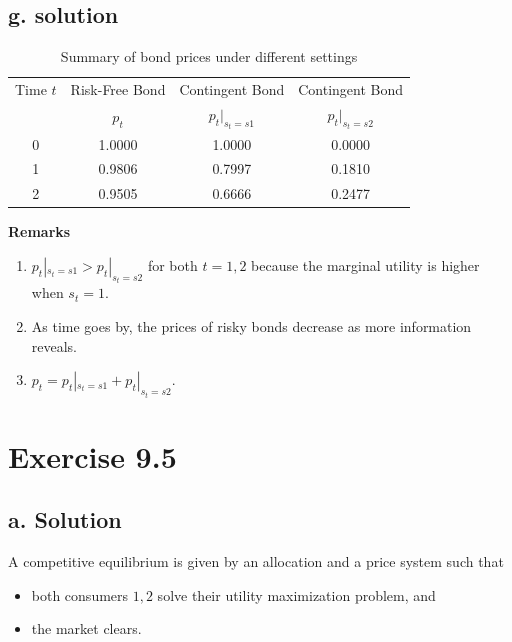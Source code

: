 \documentclass[11pt]{article}
\theoremstyle{definition}
\theoremstyle{boldtitle} %
\numberwithin{equation}{section}
\numberwithin{figure}{section}
\numberwithin{table}{section}
\begin{document}
\subsection{g. solution}
\begin{table}[h!]
\centering
\caption{Summary of bond prices under different settings}
\begin{tabular}{cccc}
\hline
Time $t$ & Risk-Free Bond & Contingent Bond & Contingent Bond \\ 
         &  $p_t$         &  $p_t|_{s_t = s1}$ & $p_t|_{s_t = s2}$ \\ \hline
0        & 1.0000               & 1.0000                           & 0.0000                           \\ 
1        & 0.9806               & 0.7997                           & 0.1810                           \\ 
2        & 0.9505               & 0.6666                           & 0.2477                           \\ \hline
\end{tabular}
\end{table}
\noindent \textbf{Remarks}
\begin{enumerate}
  \item $p_t|_{s_t = s1} > p_t|_{s_t = s2}$ for both $t = 1, 2$ because the marginal utility is higher when $s_t = 1$.
  \item As time goes by, the prices of risky bonds decrease as more information reveals.
  \item $p_t = p_t|_{s_t = s1} + p_t|_{s_t = s2}$.
\end{enumerate}


\section{Exercise 9.5}
\subsection{a. Solution}
A competitive equilibrium is given by an allocation and a price system such that 
\begin{itemize}
  \item both consumers $1,2$ solve their utility maximization problem, and
  \item the market clears.
\end{itemize}
\end{document}
